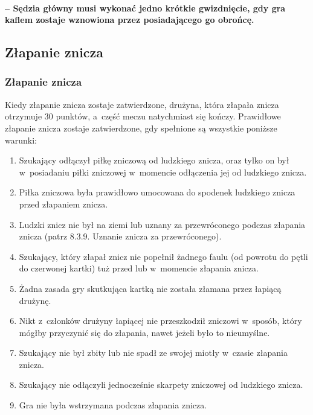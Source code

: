 \documentclass[12pt]{article}
\begin{document}
\paragraph{ -- Sędzia główny musi wykonać jedno krótkie
	gwizdnięcie, gdy gra kaflem zostaje wznowiona przez posiadającego go
	obrońcę.}

\subsection{Złapanie znicza}

\subsubsection{Złapanie znicza}

Kiedy złapanie znicza zostaje zatwierdzone, drużyna, która złapała
znicza otrzymuje 30 punktów, a~część meczu natychmiast się kończy.
Prawidłowe złapanie znicza zostaje zatwierdzone, gdy spełnione są
wszystkie poniższe warunki:

\begin{enumerate}
	\item
	      Szukający odłączył piłkę zniczową od ludzkiego znicza, oraz tylko on
	      był w~posiadaniu piłki zniczowej w~momencie odłączenia jej od
	      ludzkiego znicza.
	\item
	      Piłka zniczowa była prawidłowo umocowana do spodenek ludzkiego znicza
	      przed złapaniem znicza.
	\item
	      Ludzki znicz nie był na ziemi lub uznany za przewróconego podczas
	      złapania znicza (patrz 8.3.9. Uznanie znicza za przewróconego).
	\item
	      Szukający, który złapał znicz nie popełnił żadnego faulu (od powrotu
	      do pętli do czerwonej kartki) tuż przed lub w~momencie złapania
	      znicza.
	\item
	      Żadna zasada gry skutkująca kartką nie została złamana przez łapiącą
	      drużynę.
	\item
	      Nikt z~członków drużyny łapiącej nie przeszkodził zniczowi w~sposób,
	      który mógłby przyczynić się do złapania, nawet jeżeli było to
	      nieumyślne.
	\item
	      Szukający nie był zbity lub nie spadł ze swojej miotły w~czasie
	      złapania znicza.
	\item
	      Szukający nie odłączyli jednocześnie skarpety zniczowej od ludzkiego
	      znicza.
	\item
	      Gra nie była wstrzymana podczas złapania znicza.
\end{enumerate}
\end{document}
